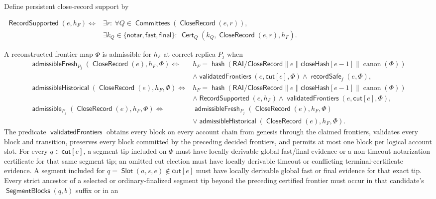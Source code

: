 \documentclass[sigplan,twocolumn,review,anonymous]{acmart}
\newcommand{\func}[1]{\operatorname{\mathsf{#1}}}
\newcommand{\hash}{\func{hash}}
\newcommand{\Cert}{\func{Cert}}
\newcommand{\Slot}{\func{Slot}}
\newcommand{\SegmentBlocks}{\func{SegmentBlocks}}
\newcommand{\CloseRecord}{\func{CloseRecord}}
\newcommand{\admissible}{\func{admissible}}
\newcommand{\admissibleFresh}{\func{admissibleFresh}}
\newcommand{\admissibleHistorical}{\func{admissibleHistorical}}
\newcommand{\notarKind}{\mathsf{notar}}
\newcommand{\fastKind}{\mathsf{fast}}
\newcommand{\finalKind}{\mathsf{final}}
\newcommand{\closeHash}{\mathsf{closeHash}}
\newcommand{\Committees}{\func{Committees}}
\newcommand{\recordSafe}{\func{recordSafe}}
\newcommand{\RecordSupported}{\func{RecordSupported}}
\newcommand{\closeCut}{\mathsf{cut}}
\begin{document}
Define persistent close-record support by
\begin{center}
\begin{adjustbox}{max width=\columnwidth}
\(\displaystyle
\begin{aligned}
\RecordSupported(e,h_F)\iff{}&\exists r:\ \forall Q\in\Committees(\CloseRecord(e,r)),\\
&\exists k_Q\in\{\notarKind,\fastKind,\finalKind\}:\
\Cert_Q(k_Q,\CloseRecord(e,r),h_F).
\end{aligned}
\)
\end{adjustbox}
\end{center}
A reconstructed frontier map \(\Phi\) is admissible for \(h_F\) at correct replica \(P_j\) when
\[
\begin{aligned}
\admissibleFresh_{P_j}(\CloseRecord(e),h_F,\Phi)\iff{}&
 h_F=\hash(\mathsf{RAI/CloseRecord}\parallel e\parallel\closeHash[e-1]
       \parallel\operatorname{canon}(\Phi))\\
&\wedge\func{validatedFrontiers}(e,\closeCut[e],\Phi)
\wedge\recordSafe_j(e,\Phi),\\
\admissibleHistorical(\CloseRecord(e),h_F,\Phi)\iff{}&
 h_F=\hash(\mathsf{RAI/CloseRecord}\parallel e\parallel\closeHash[e-1]
       \parallel\operatorname{canon}(\Phi))\\
&\wedge\RecordSupported(e,h_F)
\wedge\func{validatedFrontiers}(e,\closeCut[e],\Phi),\\
\admissible_{P_j}(\CloseRecord(e),h_F,\Phi)\iff{}&
\admissibleFresh_{P_j}(\CloseRecord(e),h_F,\Phi)\\
&\vee\admissibleHistorical(\CloseRecord(e),h_F,\Phi).
\end{aligned}
\]
The predicate \(\func{validatedFrontiers}\) obtains every block on every account chain from genesis
through the claimed frontiers, validates every block and transition, preserves every block committed by
the preceding decided frontiers, and permits at most one block per logical account slot.  For every
\(q\in\closeCut[e]\), a segment tip included on \(\Phi\) must have locally derivable global fast/final
evidence or a non-timeout notarization certificate for that same segment tip; an omitted cut election
must have locally derivable timeout or conflicting terminal-certificate evidence.  A segment included
for \(q=\Slot(a,s,e)\notin\closeCut[e]\) must have locally derivable global fast or final evidence for
that exact tip.  Every strict ancestor of a selected or ordinary-finalized segment tip beyond the
preceding certified frontier must occur in that candidate's \(\SegmentBlocks(q,b)\) suffix or in an
\end{document}
